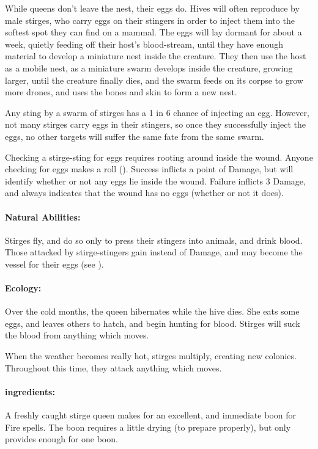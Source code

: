 \begin{multicols}{2}
While queens don't leave the nest, their eggs do.
Hives will often reproduce by male stirges, who carry eggs on their stingers in order to inject them into the softest spot they can find on a mammal.
The eggs will lay dormant for about a week, quietly feeding off their host's blood-stream, until they have enough material to develop a miniature nest inside the creature.
They then use the host as a mobile nest, as a miniature swarm develops inside the creature, growing larger, until the creature finally dies, and the swarm feeds on its corpse to grow more drones, and uses the bones and skin to form a new nest.

\label{stirgeEggs}
Any sting by a swarm of stirges has a 1 in 6 chance of injecting an egg.
However, not many stirges carry eggs in their stingers, so once they successfully inject the eggs, no other targets will suffer the same fate from the same swarm.

Checking a stirge-sting for eggs requires rooting around inside the wound.
Anyone checking for eggs makes a  roll (\tn[12]).
Success inflicts a point of Damage, but will identify whether or not any eggs lie inside the wound.
Failure inflicts 3 Damage, and always indicates that the wound has no eggs (whether or not it does).

\paragraph{Natural Abilities:}
Stirges fly, and do so only to press their stingers into animals, and drink blood.
Those attacked by stirge-stingers gain  instead of Damage, and may become the vessel for their eggs (see ).

\paragraph{Ecology:}
Over the cold months, the queen hibernates while the hive dies.
She eats some eggs, and leaves others to hatch, and begin hunting for blood.
Stirges will suck the blood from anything which moves.

When the weather becomes really hot, stirges multiply, creating new colonies.
Throughout this time, they attack anything which moves.

\paragraph{\Glspl{ingredient}:}
A freshly caught stirge queen makes for an excellent, and immediate \gls{boon} for Fire spells.
The \gls{boon} requires a little drying (\tn[5] to prepare properly), but only provides enough for one \gls{boon}.


\end{multicols}

